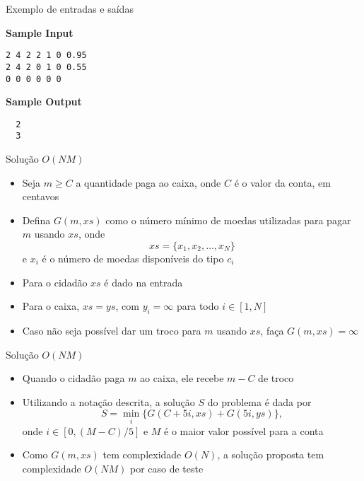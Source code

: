 \begin{frame}[fragile]{Exemplo de entradas e saídas}

\begin{minipage}[t]{0.45\textwidth}
\textbf{Sample Input}
\begin{verbatim}
2 4 2 2 1 0 0.95
2 4 2 0 1 0 0.55
0 0 0 0 0 0
\end{verbatim}
\end{minipage}
\begin{minipage}[t]{0.5\textwidth}
\textbf{Sample Output}
\begin{verbatim}
  2
  3
\end{verbatim}
\end{minipage}
\end{frame}

\begin{frame}[fragile]{Solução $O(NM)$}

   \begin{itemize}
        \item Seja $m \geq C$ a quantidade paga ao caixa, onde $C$ é o valor da conta, em centavos

        \item Defina $G(m, xs)$ como o número mínimo de moedas utilizadas para pagar $m$ usando
            $xs$, onde
        \[
            xs = \{ x_1, x_2, \ldots, x_N \}
        \]
        e $x_i$ é o número de moedas disponíveis do tipo $c_i$
    
        \item Para o cidadão $xs$ é dado na entrada

        \item Para o caixa, $xs = ys$, com $y_i = \infty$ para todo $i\in [1, N]$

        \item Caso não seja possível dar um troco para $m$ usando $xs$, faça $G(m, xs) = \infty$
   \end{itemize}

\end{frame}

\begin{frame}[fragile]{Solução $O(NM)$}

    \begin{itemize}
        \item Quando o cidadão paga $m$ ao caixa, ele recebe $m - C$ de troco

        \item Utilizando a notação descrita, a solução $S$ do problema é dada por
        \[
            S = \min_i\{ G(C + 5i, xs) + G(5i, ys) \},
        \]
        onde $i\in [0, (M - C)/5]$ e $M$ é o maior valor possível para a conta

        \item Como $G(m, xs)$ tem complexidade $O(N)$, a solução proposta tem complexidade 
            $O(NM)$ por caso de teste
    \end{itemize}

\end{frame}


